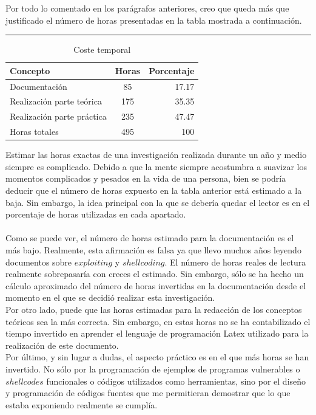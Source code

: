 \documentclass [titlepage, 12pt]{article}
\newcommand{\topfigrule}{\hrule\vspace{4 pt}}
\newcommand{\botfigrule}{\hrule\vspace{4 pt}}
\begin{document}
Por todo lo comentado en los par\'agrafos anteriores, creo que queda m\'as que justificado el n\'umero de horas presentadas en la tabla mostrada a continuaci\'on. 

\begin{table}[!htp]
	\topfigrule
   	\addtolength{\abovecaptionskip}{-12pt}   	
   	\caption{Coste temporal}
   	\label{tab:coste temporal}   		
	\begin{center}
	\begin{tabular}{||l | c | r||}
		\hline
		\hline
		Concepto & Horas & Porcentaje \\
		\hline
		Documentaci\'on & 85 & 17.17\\
		\hline
		Realizaci\'on parte te\'orica & 175 & 35.35\\
		\hline
		Realizaci\'on parte pr\'actica & 235 & 47.47\\
		\hline
		Horas totales & 495 & 100\\
		\hline
	\end{tabular} %
	\end{center}
\end{table}

Estimar las horas exactas de una investigaci\'on realizada durante un a\~no y medio siempre es complicado. Debido a que la mente siempre acostumbra a suavizar los momentos complicados y pesados en la vida de una persona, bien se podr\'ia deducir que el n\'umero de horas expuesto en la tabla anterior est\'a estimado a la baja. Sin embargo, la idea principal con la que se deber\'ia quedar el lector es en el porcentaje de horas utilizadas en cada apartado. \\
\\
Como se puede ver, el n\'umero de horas estimado para la documentaci\'on es el m\'as bajo. Realmente, esta afirmaci\'on es falsa ya que llevo muchos a\~nos leyendo documentos sobre $exploiting$ y $shellcoding$. El n\'umero de horas reales de lectura realmente sobrepasar\'ia con creces el estimado. Sin embargo, s\'olo se ha hecho un c\'alculo aproximado del n\'umero de horas invertidas en la documentaci\'on desde el momento en el que se decidi\'o realizar esta investigaci\'on.\\
Por otro lado, puede que las horas estimadas para la redacci\'on de los conceptos te\'oricos sea la m\'as correcta. Sin embargo, en estas horas no se ha contabilizado el tiempo invertido en aprender el lenguaje de programaci\'on Latex utilizado para la realizaci\'on de este documento. 
\\
Por \'ultimo, y sin lugar a dudas, el aspecto pr\'actico es en el que m\'as horas se han invertido. No s\'olo por la programaci\'on de ejemplos de programas vulnerables o $shellcodes$ funcionales o c\'odigos utilizados como herramientas, sino por el dise\~no y programaci\'on de c\'odigos fuentes que me permitieran demostrar que lo que estaba exponiendo realmente se cumpl\'ia.
\end{document}
